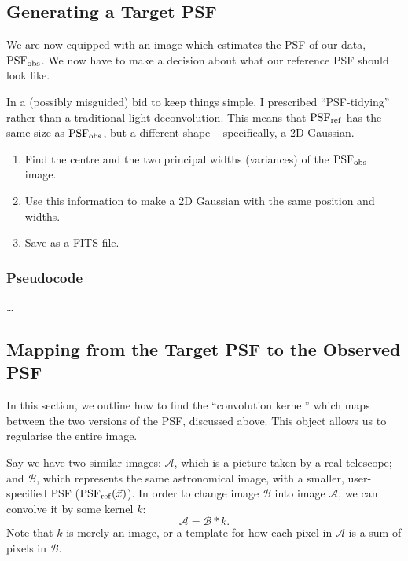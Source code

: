 \documentclass[letterpaper, 11pt]{article}
\def\psfobs{\ensuremath{{\rm PSF_{obs}}}\xspace}
\def\psfref{\ensuremath{{\rm PSF_{ref}}}\xspace}
\begin{document}
\subsection{Generating a Target PSF}

We are now equipped with an image which estimates the PSF of our data, \psfobs. We now have to make a decision about what our reference PSF should look like.

In a (possibly misguided) bid to keep things simple, I prescribed ``PSF-tidying'' rather than a traditional light deconvolution. This means that \psfref has the same size as \psfobs, but a different shape -- specifically, a 2D Gaussian.
\begin{enumerate}
	\item Find the centre and the two principal widths (variances) of the \psfobs image.
	\item Use this information to make a 2D Gaussian with the same position and widths.
	\item Save as a FITS file.
\end{enumerate}


\subsubsection{Pseudocode}

\ldots

\subsection{Mapping from the Target PSF to the Observed PSF}
\label{sec:kernel}

In this section, we outline how to find the ``convolution kernel'' which maps between the two versions of the PSF, discussed above. This object allows us to regularise the entire image.

Say we have two similar images: $\mathcal{A}$, which is a picture taken by a real telescope; and $\mathcal{B}$, which represents the same astronomical image, with a smaller, user-specified PSF ($\psfref(\vec x)$). In order to change image $\mathcal B$ into image $\mathcal A$, we can convolve it by some kernel $k$:
\begin{equation}
	\mathcal A = \mathcal B \ast k.
\end{equation}
Note that $k$ is merely an image, or a template for how each pixel in $\mathcal A$ is a sum of pixels in $\mathcal B$.
\end{document}
